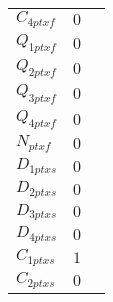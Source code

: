 \documentclass[a4paper,10.0pt]{article}
\begin{document}
{\begin{longtabu}{| l l l |}
  $C_{4 ptxf}$\hspace{0.5cm} & $0$\hspace{0.5cm} & \hspace{0.5cm}\\
  $Q_{1 ptxf}$\hspace{0.5cm} & $0$\hspace{0.5cm} & \hspace{0.5cm}\\
  $Q_{2 ptxf}$\hspace{0.5cm} & $0$\hspace{0.5cm} & \hspace{0.5cm}\\
  $Q_{3 ptxf}$\hspace{0.5cm} & $0$\hspace{0.5cm} & \hspace{0.5cm}\\
  $Q_{4 ptxf}$\hspace{0.5cm} & $0$\hspace{0.5cm} & \hspace{0.5cm}\\
  $N_{ptxf}$\hspace{0.5cm} & $0$\hspace{0.5cm} & \hspace{0.5cm}\\
  $D_{1 ptxs}$\hspace{0.5cm} & $0$\hspace{0.5cm} & \hspace{0.5cm}\\
  $D_{2 ptxs}$\hspace{0.5cm} & $0$\hspace{0.5cm} & \hspace{0.5cm}\\
  $D_{3 ptxs}$\hspace{0.5cm} & $0$\hspace{0.5cm} & \hspace{0.5cm}\\
  $D_{4 ptxs}$\hspace{0.5cm} & $0$\hspace{0.5cm} & \hspace{0.5cm}\\
  $C_{1 ptxs}$\hspace{0.5cm} & $1$\hspace{0.5cm} & \hspace{0.5cm}\\
  $C_{2 ptxs}$\hspace{0.5cm} & $0$\hspace{0.5cm} & \hspace{0.5cm}\\

\end{longtabu}}
\end{document}

